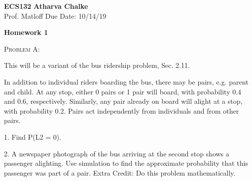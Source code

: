 \documentclass[12pt]{article}
\newenvironment{statement}[1]
{\begin{mdframed}[linewidth=0.6pt]
        \textsc{ #1:}

}
    {\end{mdframed}}
\begin{document}
\noindent
\textbf{ECS132} \hfill \textbf{Atharva Chalke} \\
\normalsize Prof. Matloff \hfill Due Date: 10/14/19 \\


\begin{center}
\textbf{Homework 1}
\end{center}

\begin{statement}{Problem A}
This will be a variant of the bus ridership problem, Sec. 2.11.

In addition to individual riders boarding the bus, there may be pairs, e.g. parent and child. At any stop, either 0 pairs or 1 pair will board, with probability 0.4 and 0.6, respectively. Similarly, any pair already on board will alight at a stop, with probability 0.2. Pairs act independently from individuals and from other pairs.

1. Find P(L2 = 0).

2. A newspaper photograph of the bus arriving at the second stop shows a passenger alighting. Use simulation to find the approximate probability that this passenger was part of a pair. Extra Credit: Do this problem mathematically.
\end{statement}

\end{document}
